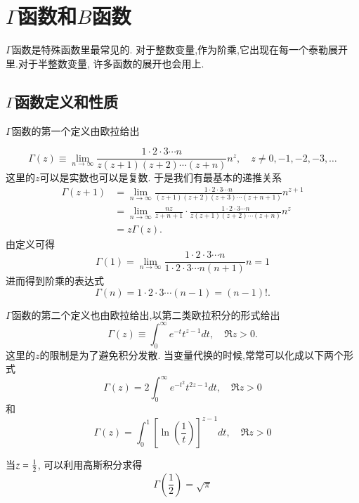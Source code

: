 \section{$\Gamma$函数和$B$函数}
$\Gamma$函数是特殊函数里最常见的. 对于整数变量,作为阶乘,它出现在每一个泰勒展开里.对于半整数变量,
许多函数的展开也会用上.

\subsection{$\Gamma$函数定义和性质}

$\Gamma$函数的第一个定义由欧拉给出

\begin{equation}
    \Gamma(z) \equiv \lim _{n \rightarrow \infty} \frac{1 \cdot 2 \cdot 3 \cdots n}{z(z+1)(z+2) \cdots(z+n)} n^{z}, \quad z \neq 0,-1,-2,-3, \ldots
    \label{eq:gamma_def_euler}
\end{equation}
这里的$z$可以是实数也可以是复数. 于是我们有最基本的递推关系
\begin{equation}
\begin{aligned}
\Gamma(z+1) & =\lim _{n \rightarrow \infty} \frac{1 \cdot 2 \cdot 3 \cdots n}{(z+1)(z+2)(z+3) \cdots(z+n+1)} n^{z+1} \\
& =\lim _{n \rightarrow \infty} \frac{n z}{z+n+1} \cdot \frac{1 \cdot 2 \cdot 3 \cdots n}{z(z+1)(z+2) \cdots(z+n)} n^{z} \\
& =z \Gamma(z) .
\end{aligned}
\end{equation}
由定义可得
\begin{equation}
    \Gamma(1)=\lim _{n \rightarrow \infty} \frac{1 \cdot 2 \cdot 3 \cdots n}{1 \cdot 2 \cdot 3 \cdots n(n+1)} n=1
\end{equation}
进而得到阶乘的表达式
\begin{equation}
    \Gamma(n)=1 \cdot 2 \cdot 3 \cdots(n-1)=(n-1) ! .
\end{equation}

$\Gamma$函数的第二个定义也由欧拉给出,以第二类欧拉积分的形式给出
\begin{equation}
    \Gamma(z) \equiv \int_{0}^{\infty} e^{-t} t^{z-1} d t, \quad \Re z>0 .
\end{equation}
这里的$z$的限制是为了避免积分发散. 当变量代换的时候,常常可以化成以下两个形式
$$
\Gamma(z)=2 \int_{0}^{\infty} e^{-t^{2}} t^{2 z-1} d t, \quad \Re z>0
$$
和
$$
\Gamma(z)=\int_{0}^{1}\left[\ln \left(\frac{1}{t}\right)\right]^{z-1} d t, \quad \Re z>0
$$

当$z={\frac{1}{2}}$, 可以利用高斯积分求得
$$
\Gamma\left(\frac{1}{2}\right)=\sqrt{\pi}
$$


